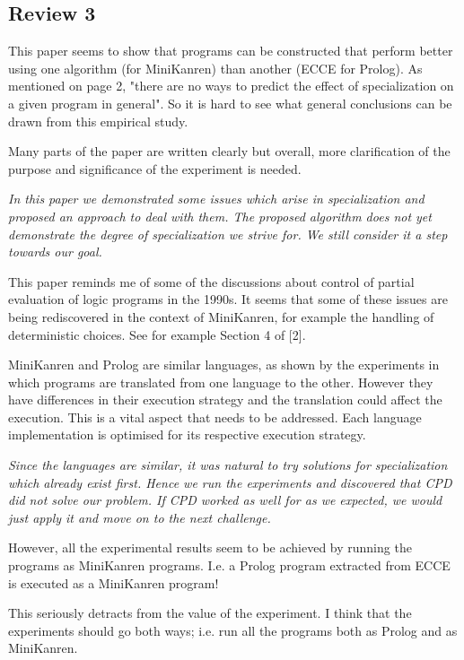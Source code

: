 \subsection*{Review 3}

This paper seems to show that programs can be constructed that perform better using one algorithm (for MiniKanren) than another (ECCE for Prolog).  As mentioned on page 2, "there are no ways to predict the effect of specialization on a given program in general".  So it is hard to see what general conclusions can be drawn from this empirical study.

Many parts of the paper are written clearly but overall, more clarification of the purpose and significance of the experiment is needed.

\emph{In this paper we demonstrated some issues which arise in \mk specialization and proposed an approach to deal with them. The proposed algorithm does not yet demonstrate the degree of specialization we strive for. We still consider it a step towards our goal. }

This paper reminds me of some of the discussions about control of partial evaluation of logic programs in the 1990s.  It seems that some of these issues are being rediscovered in the context of MiniKanren, for example the handling of deterministic choices.  See for example Section 4 of [2].

MiniKanren and Prolog are similar languages, as shown by the experiments in which programs are translated from one language to the other.  However they have differences in their execution strategy and the translation could affect the execution.  This is a vital aspect that needs to be addressed.  Each language implementation is optimised for its respective execution strategy.

\emph{Since the languages are similar, it was natural to try solutions for specialization which already exist first. Hence we run the experiments and discovered that CPD did not solve our problem. If CPD worked as well for \mk as we expected, we would just apply it and move on to the next challenge.}

However, all the experimental results seem to be achieved by running the programs as MiniKanren programs.  I.e. a Prolog program extracted from ECCE is executed as a MiniKanren program!

This seriously detracts from the value of the experiment. I think that the experiments should go both ways; i.e. run all the programs both as Prolog and as MiniKanren.


